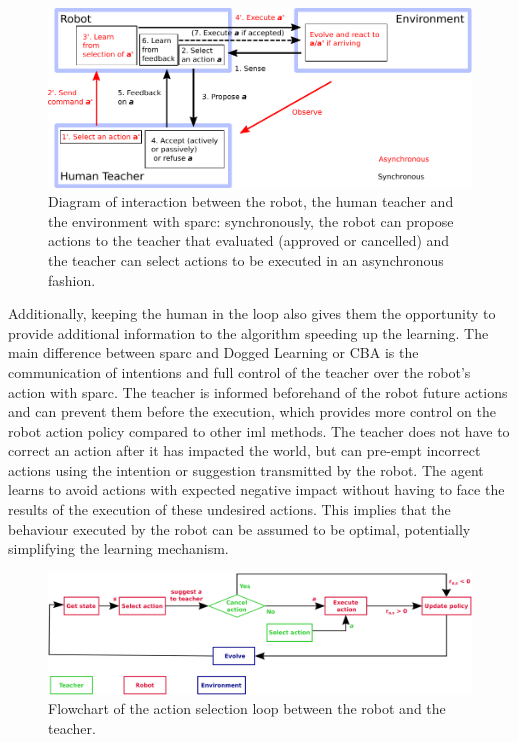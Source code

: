 \begin{figure}[ht]
	\includegraphics[width=1\linewidth]{diagram.pdf}
	\centering
	\caption{Diagram of interaction between the robot, the human teacher and the environment with \gls{sparc}: synchronously, the robot can propose actions to the teacher that evaluated (approved or cancelled) and the teacher can select actions to be executed in an asynchronous fashion.}
	\label{fig:sparc_diagram}
\end{figure}

Additionally, keeping the human in the loop also gives them the opportunity to provide additional information to the algorithm speeding up the learning. The main difference between \gls{sparc} and Dogged Learning or CBA \citep{chernova2009interactive} is the communication of intentions and full control of the teacher over the robot's action with \gls{sparc}. The teacher is informed beforehand of the robot future actions and can prevent them before the execution, which provides more control on the robot action policy compared to other \gls{iml} methods. The teacher does not have to correct an action after it has impacted the world, but can pre-empt incorrect actions using the intention or suggestion transmitted by the robot. The agent learns to avoid actions with expected negative impact without having to face the results of the execution of these undesired actions. This implies that the behaviour executed by the robot can be assumed to be optimal, potentially simplifying the learning mechanism.

\begin{figure}[ht]
	\includegraphics[width=1\linewidth]{flowchart.pdf}
	\centering
	\caption{Flowchart of the action selection loop between the robot and the teacher.}
	\label{fig:sparc_flowchart}
\end{figure}


